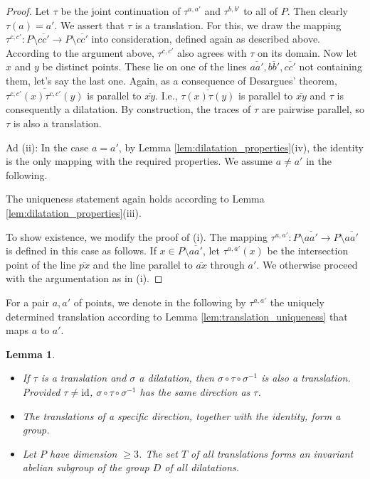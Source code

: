 \documentclass[11pt,a4paper]{article}
\newcommand{\lineab}[1]{\overline{#1}}
\newtheorem{lemma}[theorem]{Lemma}
\begin{document}
\begin{proof}
Let $\tau$ be the joint continuation of $\tau^{a,a'}$ and $\tau^{b,b'}$ to all of $P$. Then clearly $\tau(a) = a'$. We assert that $\tau$ is a translation. For this, we draw the mapping $\tau^{c,c'}: P \setminus \lineab{cc'} \to P \setminus \lineab{cc'}$ into consideration, defined again as described above. According to the argument above, $\tau^{c,c'}$ also agrees with $\tau$ on its domain. Now let $x$ and $y$ be distinct points. These lie on one of the lines $\lineab{aa'}, \lineab{bb'}, \lineab{cc'}$ not containing them, let's say the last one. Again, as a consequence of Desargues' theorem, $\lineab{\tau^{c,c'}(x)\tau^{c,c'}(y)}$ is parallel to $\lineab{xy}$. I.e., $\lineab{\tau(x)\tau(y)}$ is parallel to $\lineab{xy}$ and $\tau$ is consequently a dilatation. By construction, the traces of $\tau$ are pairwise parallel, so $\tau$ is also a translation.

Ad (ii): In the case $a = a'$, by Lemma \ref{lem:dilatation_properties}(iv), the identity is the only mapping with the required properties. We assume $a \neq a'$ in the following.

The uniqueness statement again holds according to Lemma \ref{lem:dilatation_properties}(iii).

To show existence, we modify the proof of (i). The mapping $\tau^{a,a'}: P \setminus \lineab{aa'} \to P \setminus \lineab{aa'}$ is defined in this case as follows. If $x \in P \setminus \lineab{aa'}$, let $\tau^{a,a'}(x)$ be the intersection point of the line $\lineab{px}$ and the line parallel to $\lineab{ax}$ through $a'$. We otherwise proceed with the argumentation as in (i).
\end{proof}

For a pair $a, a'$ of points, we denote in the following by $\tau^{a,a'}$ the uniquely determined translation according to Lemma \ref{lem:translation_uniqueness} that maps $a$ to $a'$.

\begin{lemma} \label{lem:translation_group}
\begin{itemize}
    \item[(i)] If $\tau$ is a translation and $\sigma$ a dilatation, then $\sigma \circ \tau \circ \sigma^{-1}$ is also a translation. Provided $\tau \neq \text{id}$, $\sigma \circ \tau \circ \sigma^{-1}$ has the same direction as $\tau$.
    \item[(ii)] The translations of a specific direction, together with the identity, form a group.
    \item[(iii)] Let $P$ have dimension $\ge 3$. The set $T$ of all translations forms an invariant abelian subgroup of the group $D$ of all dilatations.
\end{itemize}
\end{lemma}
\end{document}
